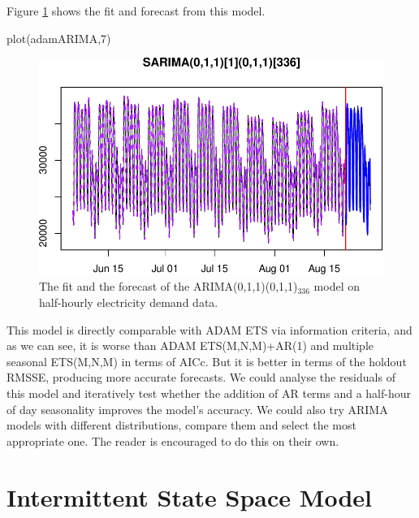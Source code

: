 \documentclass[
]{book}
\newenvironment{Shaded}{\begin{snugshade}}{\end{snugshade}}
\newcommand{\DecValTok}[1]{\textcolor[rgb]{0.00,0.00,0.81}{#1}}
\newcommand{\FunctionTok}[1]{\textcolor[rgb]{0.00,0.00,0.00}{#1}}
\newcommand{\NormalTok}[1]{#1}
\theoremstyle{definition}
\theoremstyle{definition}
\theoremstyle{definition}
\theoremstyle{definition}
\theoremstyle{remark}
\begin{document}
Figure \ref{fig:adamARIMA} shows the fit and forecast from this model.

\begin{Shaded}
\begin{Highlighting}[]
\FunctionTok{plot}\NormalTok{(adamARIMA,}\DecValTok{7}\NormalTok{)}
\end{Highlighting}
\end{Shaded}

\begin{figure}
\centering
\includegraphics{Svetunkov--2022----ADAM_files/figure-latex/adamARIMA-1.pdf}
\caption{\label{fig:adamARIMA}The fit and the forecast of the ARIMA(0,1,1)(0,1,1)\(_336\) model on half-hourly electricity demand data.}
\end{figure}

This model is directly comparable with ADAM ETS via information criteria, and as we can see, it is worse than ADAM ETS(M,N,M)+AR(1) and multiple seasonal ETS(M,N,M) in terms of AICc. But it is better in terms of the holdout RMSSE, producing more accurate forecasts. We could analyse the residuals of this model and iteratively test whether the addition of AR terms and a half-hour of day seasonality improves the model's accuracy. We could also try ARIMA models with different distributions, compare them and select the most appropriate one. The reader is encouraged to do this on their own.

\hypertarget{ADAMIntermittent}{%
\chapter{Intermittent State Space Model}\label{ADAMIntermittent}}
\end{document}
